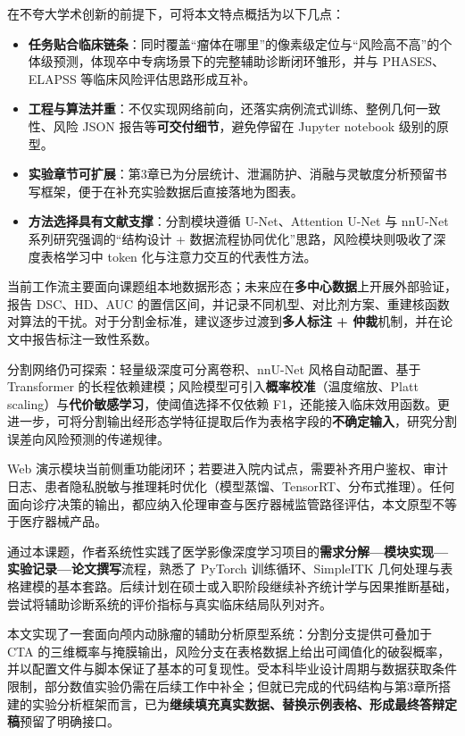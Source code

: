 在不夸大学术创新的前提下，可将本文特点概括为以下几点：
\begin{itemize}
	\item \textbf{任务贴合临床链条}：同时覆盖“瘤体在哪里”的像素级定位与“风险高不高”的个体级预测，体现卒中专病场景下的完整辅助诊断闭环雏形，并与 PHASES、ELAPSS 等临床风险评估思路形成互补。
	\item \textbf{工程与算法并重}：不仅实现网络前向，还落实病例流式训练、整例几何一致性、风险 JSON 报告等\textbf{可交付细节}，避免停留在 Jupyter  notebook 级别的原型。
	\item \textbf{实验章节可扩展}：第3章已为分层统计、泄漏防护、消融与灵敏度分析预留书写框架，便于在补充实验数据后直接落地为图表。
	\item \textbf{方法选择具有文献支撑}：分割模块遵循 U-Net、Attention U-Net 与 nnU-Net 系列研究强调的“结构设计 + 数据流程协同优化”思路，风险模块则吸收了深度表格学习中 token 化与注意力交互的代表性方法。
\end{itemize}

当前工作流主要面向课题组本地数据形态；未来应在\textbf{多中心数据}上开展外部验证，报告 DSC、HD、AUC 的置信区间，并记录不同机型、对比剂方案、重建核函数对算法的干扰。对于分割金标准，建议逐步过渡到\textbf{多人标注 + 仲裁}机制，并在论文中报告标注一致性系数。

分割网络仍可探索：轻量级深度可分离卷积、nnU-Net 风格自动配置、基于 Transformer 的长程依赖建模；风险模型可引入\textbf{概率校准}（温度缩放、Platt scaling）与\textbf{代价敏感学习}，使阈值选择不仅依赖 F1，还能接入临床效用函数。更进一步，可将分割输出经形态学特征提取后作为表格字段的\textbf{不确定输入}，研究分割误差向风险预测的传递规律。

Web 演示模块当前侧重功能闭环；若要进入院内试点，需要补齐用户鉴权、审计日志、患者隐私脱敏与推理耗时优化（模型蒸馏、TensorRT、分布式推理）。任何面向诊疗决策的输出，都应纳入伦理审查与医疗器械监管路径评估，本文原型不等于医疗器械产品。

通过本课题，作者系统性实践了医学影像深度学习项目的\textbf{需求分解—模块实现—实验记录—论文撰写}流程，熟悉了 PyTorch 训练循环、SimpleITK 几何处理与表格建模的基本套路。后续计划在硕士或入职阶段继续补齐统计学与因果推断基础，尝试将辅助诊断系统的评价指标与真实临床结局队列对齐。

本文实现了一套面向颅内动脉瘤的辅助分析原型系统：分割分支提供可叠加于 CTA 的三维概率与掩膜输出，风险分支在表格数据上给出可阈值化的破裂概率，并以配置文件与脚本保证了基本的可复现性。受本科毕业设计周期与数据获取条件限制，部分数值实验仍需在后续工作中补全；但就已完成的代码结构与第3章所搭建的实验分析框架而言，已为\textbf{继续填充真实数据、替换示例表格、形成最终答辩定稿}预留了明确接口。
